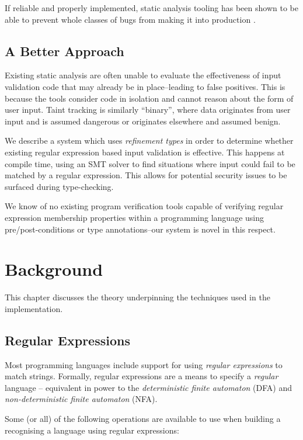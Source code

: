 \documentclass[a4paper,openany,12pt]{book}
\begin{document}
If reliable and properly implemented, static analysis tooling has been shown to be able to prevent whole classes of
bugs from making it into production \citep{sadowski2018lessons}.

\section{A Better Approach}

Existing static analysis are often unable to evaluate the effectiveness of input validation code that may already be in
place--leading to false positives.
This is because the tools consider code in isolation and cannot reason about the form of user input.
Taint tracking is similarly ``binary'', where data originates from user input and is assumed dangerous or originates
elsewhere and assumed benign.

We describe a system which uses \emph{refinement types} in order to determine whether existing regular expression based
input validation is effective.
This happens at compile time, using an SMT solver to find situations where input could fail to be matched by a regular
expression.
This allows for potential security issues to be surfaced during type-checking.

We know of no existing program verification tools capable of verifying regular expression membership properties
within a programming language using pre/post-conditions or type annotations--our system is novel in this respect.

\chapter{Background}
This chapter discusses the theory underpinning the techniques used in the implementation.

\section{Regular Expressions}
\label{regexbg}

Most programming languages include support for using \emph{regular expressions} to match strings. Formally, regular
expressions are a means to specify a \emph{regular} language -- equivalent in power to the \emph{deterministic finite
automaton} (DFA) and \emph{non-deterministic finite automaton} (NFA).

Some (or all) of the following operations are available to use when building a recognising a language using regular
expressions:
\end{document}
